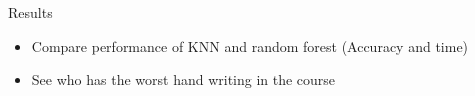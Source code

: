 \documentclass[report]{subfiles}
\begin{document}
Results\\
\begin{itemize}
	\item Compare performance of KNN and random forest (Accuracy and time)
	\item See who has the worst hand writing in the course
\end{itemize}
\end{document}
